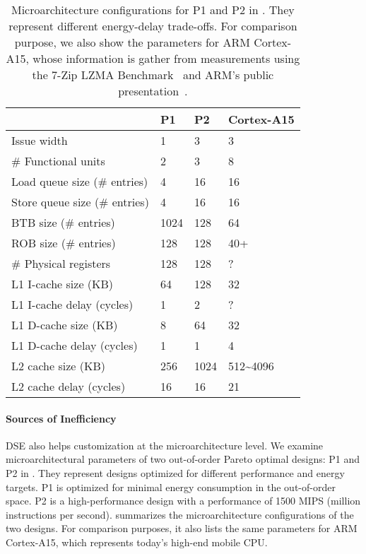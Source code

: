 \begin{table}[t]
\large
\centering
\captionsetup{width=.6\columnwidth}
\caption{\small Microarchitecture configurations for P1 and P2 in
. They represent different energy-delay trade-offs. For comparison
purpose, we also show the parameters for ARM Cortex-A15, whose information is
gather from measurements using the 7-Zip LZMA Benchmark~\cite{7cpu-a15} and
ARM's public presentation~\cite{a15-slide}.}
\renewcommand*{\arraystretch}{1.2}
\renewcommand*{\tabcolsep}{10pt}
\resizebox{.6\columnwidth}{!}
{
	\begin{tabular}{l l l l}
	\toprule[0.15em]
        ~      & \bigstrut\textbf{P1} & \bigstrut\textbf{P2} & \bigstrut\textbf{Cortex-A15}\\
	\midrule[0.05em]
        Issue width						&	1		&	3	&	3	\\
        \# Functional units				&	2		&	3	&	8	\\
        Load queue size (\# entries)		&	4		&	16	&	16	\\
        Store queue size (\# entries)	&	4		&	16	&	16	\\
        BTB size (\# entries)   &       1024    &       128 &   64       \\
        ROB size (\# entries)			&	128		&	128	&	40+	\\
        \# Physical registers			&	128		&	128	&	?	\\
        L1 I-cache size (KB)				&	64		&	128	&	32	\\
        L1 I-cache delay (cycles)		&	1		&	2	&	?	\\
        L1 D-cache size (KB)				&	8		&	64	&	32	\\
        L1 D-cache delay (cycles)		&	1		&	1	&	4	\\
        L2 cache size (KB)				&	256&	1024	&	512\textasciitilde4096	\\
        L2 cache delay (cycles)			&	16		&	16	&	21	\\
	\bottomrule[0.15em]
    \end{tabular}
}
\label{tab:dse:ednp}
\end{table}

\paragraph{Sources of Inefficiency} DSE also helps customization at the microarchitecture level. We examine microarchitectural parameters of two out-of-order Pareto optimal designs: P1 and P2 in . They represent designs optimized for different performance and energy targets. P1 is optimized for minimal energy consumption in the out-of-order space. P2 is a high-performance design with a performance of 1500 MIPS (million instructions per second).  summarizes the microarchitecture configurations of the two designs. For comparison purposes, it also lists the same parameters for ARM Cortex-A15, which represents today's high-end mobile CPU.

